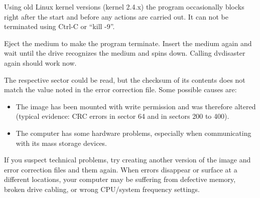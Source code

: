    { Using old Linux kernel versions (kernel 2.4.x) the program
     occasionally blocks right after the start and before any actions are
     carried out. It can not be terminated using Ctrl-C or ``kill -9''.

     \smallskip
     
     Eject the medium to make the program terminate. Insert the medium again
     and wait until the drive recognizes the medium and spins down. Calling
     dvdisaster again should work now. }

   {The respective sector could be read, but the checksum of its contents does
     not match the value noted in the error correction file. Some possible causes are:

 \begin{itemize}
 \item The image has been mounted with write permission and was
   therefore altered (typical evidence: CRC errors in sector 64 and in sectors 200 to 400).
 \item The computer has some hardware problems, especially when communicating with
   its mass storage devices.
 \end{itemize}
 
 If you suspect technical problems, try creating another version of the
 image and error correction files and  them again. When errors
 disappear or surface at a different locations, your computer may be
 suffering from defective memory, broken drive cabling, or wrong CPU/system
 frequency settings. }

